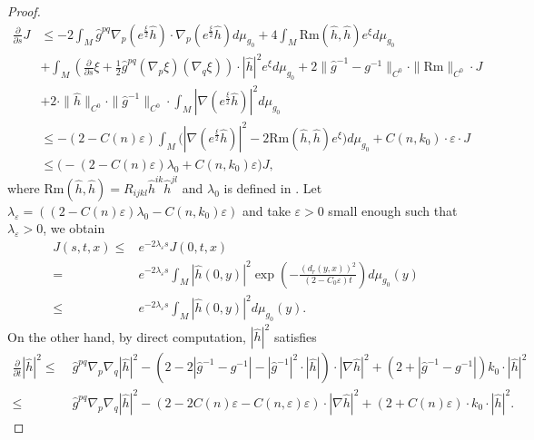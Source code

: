 \documentclass[12pt]{amsart}
\begin{document}
\begin{proof}
\begin{equation}
\begin{split}
        \frac{\partial}{\partial s} J &\leq 
        -2\int_M \hat{g}^{pq} \nabla_p (e^{\frac{\xi}{2}}\hat{h}) \cdot \nabla_p (e^{\frac{\xi}{2}}\hat{h}) d\mu_{g_0} 
        + 4 \int_{M}\mathrm{Rm}(\hat{h}, \hat{h}) e^{\xi} d\mu_{g_0}\\
        &+ \int_M \left(\frac{\partial}{\partial s}\xi + \frac{1}{2}\hat{g}^{pq}(\nabla_p \xi)(\nabla_q \xi) \right) \cdot |\hat{h}|^2 e^{\xi} d\mu_{g_0} + 2\|\hat{g}^{-1} - g^{-1} \|_{C^{0}} \cdot\|\mathrm{Rm}\|_{C^{0}} \cdot J\\
        &+ 2\cdot \|\hat{h}\|_{C^{0}}\cdot \|\hat{g}^{-1}\|_{C^{0}}\cdot \int_{M}|\nabla(e^{\frac{\xi}{2}}\hat{h})|^2d\mu_{g_0}\\
        &\leq -(2 - C(n)\varepsilon) \int_M \big(|\nabla (e^{\frac{\xi}{2}}\hat{h})|^2 - 2\mathrm{Rm}(\hat{h}, \hat{h})e^{\xi}\big)d\mu_{g_0}+C(n, k_0) \cdot \varepsilon\cdot J\\
        &\leq \big(-(2 - C(n)\varepsilon) \lambda_0 + C(n, k_0)\varepsilon \big)J,
    \end{split}
\end{equation}
where $\mathrm{Rm}(\hat{h}, \hat{h}) = R_{ijkl} \hat{h}^{ik} \hat{h}^{jl}$ and $\lambda_0$ is defined in  . Let $\lambda_{\varepsilon} = ((2 - C(n)\varepsilon) \lambda_0 - C(n, k_0)\varepsilon)$ and take $\varepsilon > 0$ small enough such that $\lambda_\varepsilon > 0$, we obtain
\begin{equation}\label{formla 1}
    \begin{split}
        J(s, t, x) \leq& e^{-2\lambda_{\varepsilon} s} J(0, t, x)\\
        =& e^{-2\lambda_{\varepsilon} s} \int_{M} |\hat{h}(0, y)|^2\exp \left(-\frac{\left(d_r(y, x) \right)^2}{(2 - C_0\varepsilon)t} \right)d\mu_{g_0}(y)\\
        \leq& e^{-2\lambda_{\varepsilon} s} \int_M|\hat{h}(0, y)|^2 d\mu_{g_0}(y).
    \end{split}
\end{equation}
On the other hand, by direct computation, $|\hat{h}|^2$ satisfies
\begin{equation}
    \begin{split}
        \frac{\partial }{\partial t} |\hat{h}|^2 \leq&\; \hat{g}^{pq} \nabla_p \nabla_q |\hat{h}|^2 - (2 - 2|\hat{g}^{-1} - g^{-1}| - |\hat{g}^{-1}|^2 \cdot |\hat{h}|)\cdot |\nabla \hat{h}|^2 + (2 + |\hat{g}^{-1} - g^{-1}|)k_0\cdot |\hat{h}|^2\\
        \leq&\; \hat{g}^{pq}\nabla_p \nabla_q |\hat{h}|^2 - (2 - 2C(n) \varepsilon - C(n, \varepsilon)\varepsilon)\cdot |\nabla \hat{h}|^2 + (2 + C(n) \varepsilon)\cdot k_0\cdot |\hat{h}|^2.

\end{split}
\end{equation}
\end{proof}
\end{document}

